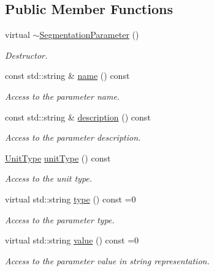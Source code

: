 \subsection*{Public Member Functions}
\begin{DoxyCompactItemize}
\item 
virtual \hyperlink{class_d_d4hep_1_1_d_d_segmentation_1_1_segmentation_parameter_a3969aaa62788ba8e9c5fe9f1ce60fe98}{$\sim$\+Segmentation\+Parameter} ()
\begin{DoxyCompactList}\small\item\em Destructor. \end{DoxyCompactList}\item 
const std\+::string \& \hyperlink{class_d_d4hep_1_1_d_d_segmentation_1_1_segmentation_parameter_a0e75457623ff527592fa127f358185a7}{name} () const
\begin{DoxyCompactList}\small\item\em Access to the parameter name. \end{DoxyCompactList}\item 
const std\+::string \& \hyperlink{class_d_d4hep_1_1_d_d_segmentation_1_1_segmentation_parameter_a426925cc561183c3d5d7c2a8afc4ceca}{description} () const
\begin{DoxyCompactList}\small\item\em Access to the parameter description. \end{DoxyCompactList}\item 
\hyperlink{class_d_d4hep_1_1_d_d_segmentation_1_1_segmentation_parameter_a36f5f8b8d812b2a2b81363377565d8d4}{Unit\+Type} \hyperlink{class_d_d4hep_1_1_d_d_segmentation_1_1_segmentation_parameter_ac3be3e721366e13e49d01cfc7ce965a4}{unit\+Type} () const
\begin{DoxyCompactList}\small\item\em Access to the unit type. \end{DoxyCompactList}\item 
virtual std\+::string \hyperlink{class_d_d4hep_1_1_d_d_segmentation_1_1_segmentation_parameter_a761f142a3d6d7ecdbc200e97913af165}{type} () const =0
\begin{DoxyCompactList}\small\item\em Access to the parameter type. \end{DoxyCompactList}\item 
virtual std\+::string \hyperlink{class_d_d4hep_1_1_d_d_segmentation_1_1_segmentation_parameter_a633dffe9e53306c5f67568ff5e567387}{value} () const =0
\begin{DoxyCompactList}\small\item\em Access to the parameter value in string representation. \end{DoxyCompactList}\item 

\end{DoxyCompactItemize}
